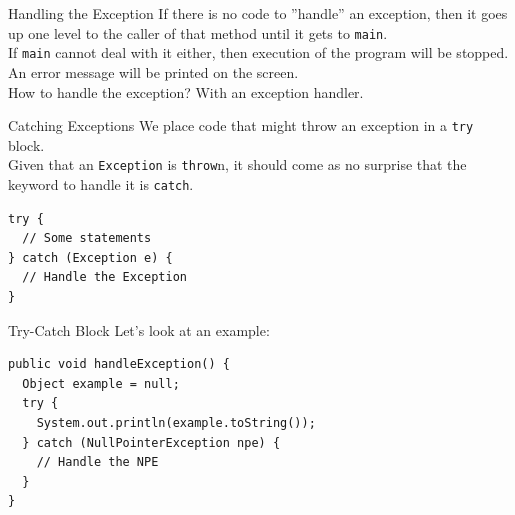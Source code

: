 \documentclass[aspectratio=169]{beamer}
\begin{document}
\begin{frame}{Handling the Exception}
If there is no code to ''handle'' an exception, then it goes up one level to the caller of that method until it gets to \texttt{main}. \\
\vspace{1em}
If \texttt{main} cannot deal with it either, then execution of the program will be stopped. \\
\vspace{1em}
An error message will be printed on the screen.  \\
\vspace{1em}
How to handle the exception? With an exception handler.  \\
\end{frame}



\begin{frame}[fragile]{Catching Exceptions}
We place code that might throw an exception in a \texttt{try} block. \\
\vspace{1em}
Given that an \texttt{Exception} is \texttt{throw}n, it should come as no surprise that the keyword to handle it is \texttt{catch}. \\
\vspace{1em}
\begin{Verbatim}
try {
  // Some statements   
} catch (Exception e) {
  // Handle the Exception
}
\end{Verbatim}
\end{frame}



\begin{frame}[fragile]{Try-Catch Block}
Let's look at an example:

\begin{Verbatim}
public void handleException() {
  Object example = null;
  try {
    System.out.println(example.toString());
  } catch (NullPointerException npe) {
    // Handle the NPE
  }
}
\end{Verbatim}
\end{frame}
\end{document}
